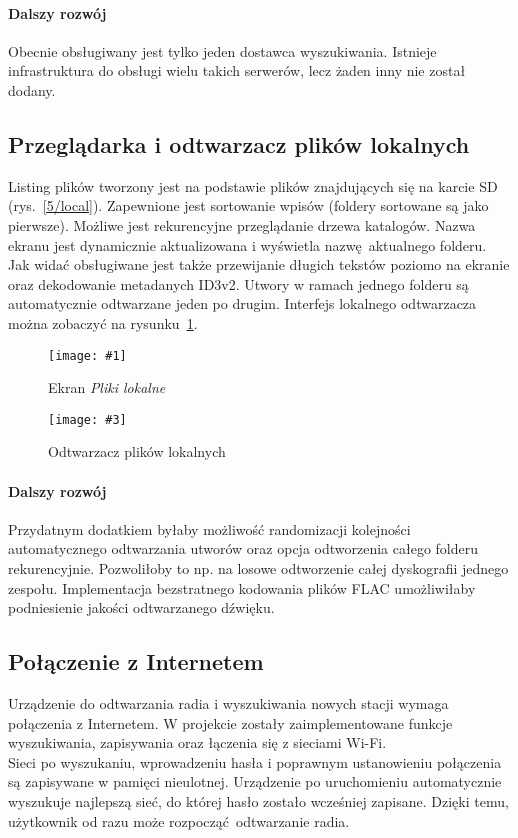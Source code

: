 \documentclass[polish]{aghengthesis}
\newcommand{\imgintss}[5]{
	\begin{figure}[{#5}]
		\centering
		\begin{minipage}{.45\textwidth}
			\centering
			\texttt{[image: \#1]}
			\caption{#2}
			\label{#1}
		\end{minipage}%
		\hfill
		\begin{minipage}{.45\textwidth}
			\centering
			\texttt{[image: \#3]}
			\caption{#4}
			\label{#3}
		\end{minipage}
	\end{figure}
}
\newcommand{\imghss}[4]{\imgintss{#1}{#2}{#3}{#4}{H}}
\begin{document}
			\paragraph{Dalszy rozwój}
				Obecnie obsługiwany jest tylko jeden dostawca wyszukiwania. Istnieje infrastruktura do obsługi wielu takich serwerów, lecz żaden inny nie został dodany.
			
		\subsection{Przeglądarka i odtwarzacz plików lokalnych}
			Listing plików tworzony jest na podstawie plików znajdujących się na karcie SD (rys.~\ref{5/local}). Zapewnione jest sortowanie wpisów (foldery sortowane są jako pierwsze). Możliwe jest rekurencyjne przeglądanie drzewa katalogów. Nazwa ekranu jest dynamicznie aktualizowana i wyświetla nazwę aktualnego folderu. Jak widać obsługiwane jest także przewijanie długich tekstów poziomo na ekranie oraz dekodowanie metadanych ID3v2. Utwory w ramach jednego folderu są automatycznie odtwarzane jeden po drugim. Interfejs lokalnego odtwarzacza można zobaczyć na rysunku~\ref{5/local_play}.
			
			\imghss{5/local}{Ekran \textit{Pliki lokalne}}{5/local_play}{Odtwarzacz plików lokalnych}
			
			\paragraph{Dalszy rozwój}
				Przydatnym dodatkiem byłaby możliwość randomizacji kolejności automatycznego odtwarzania utworów oraz opcja odtworzenia całego folderu rekurencyjnie. Pozwoliłoby to np. na losowe odtworzenie całej dyskografii jednego zespołu. Implementacja bezstratnego kodowania plików FLAC umożliwiłaby podniesienie jakości odtwarzanego dźwięku.
		
		\subsection{Połączenie z Internetem}
			Urządzenie do odtwarzania radia i wyszukiwania nowych stacji wymaga połączenia z Internetem. W projekcie zostały zaimplementowane funkcje wyszukiwania, zapisywania oraz łączenia się z sieciami Wi-Fi.
			$ $\\
			
			Sieci po wyszukaniu, wprowadzeniu hasła i poprawnym ustanowieniu połączenia są zapisywane w pamięci nieulotnej. Urządzenie po uruchomieniu automatycznie wyszukuje najlepszą sieć, do której hasło zostało wcześniej zapisane. Dzięki temu, użytkownik od razu może rozpocząć odtwarzanie radia.
	
\end{document}
